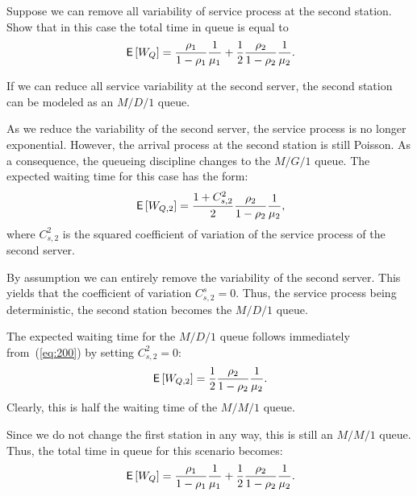 \begin{exercise}
Suppose we can remove all variability of  service process at the second station. Show that  in this case  the total time in queue is equal to
\begin{equation*}
  \,\mathsf{E}\left[W_Q\right]= \frac{\rho_1}{1-\rho_1} \frac1{\mu_1} +
  \frac12\frac{\rho_2}{1-\rho_2} \frac1{\mu_2}.
\end{equation*}
\begin{hint}
  If we can reduce all service variability at the second server, the second station can be modeled as an $M/D/1$ queue.
\end{hint}
\begin{solution}
As we reduce the variability of the second server, the service process
is no longer exponential. However, the arrival process at the second
station is still Poisson. As a consequence, the queueing discipline
changes to the $M/G/1$ queue. The expected waiting time for this case
has the form:
\begin{equation}\label{eq:200}
\,\mathsf{E}\left[W_{Q,2}\right] = \frac{1+C_{s,2}^2}2\frac{\rho_2}{1-\rho_2} \frac1{\mu_2},
\end{equation}
where $C_{s,2}^2$ is the squared coefficient of variation of the
service process of the second server.

By assumption we can entirely remove the variability of the second server.
This yields that the coefficient of variation $C_{s,2}^s = 0$.
Thus, the service process being deterministic, the second station becomes the $M/D/1$ queue.

The expected waiting time for the $M/D/1$ queue follows immediately
from~(\ref{eq:200}) by setting $C_{s,2}^2 =0$:
\begin{equation}\label{eq:300}
\,\mathsf{E}\left[W_{Q,2}\right] = \frac{1}2\frac{\rho_2}{1-\rho_2} \frac1{\mu_2}.
\end{equation}
Clearly, this is half the waiting time of the  $M/M/1$ queue. 

Since we do not change the first station in any way, this is still an
$M/M/1$ queue. 
Thus, the total time in queue for this scenario becomes:
\begin{equation*}
  \,\mathsf{E}\left[W_Q\right]= \frac{\rho_1}{1-\rho_1} \frac1{\mu_1} +
  \frac12\frac{\rho_2}{1-\rho_2} \frac1{\mu_2}. 
\end{equation*}
\end{solution}
\end{exercise}

